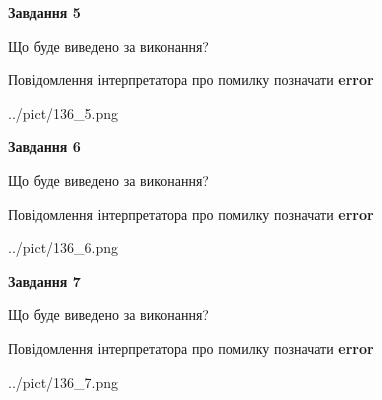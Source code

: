 \documentclass[10pt, ukrainian]{article}
\begin{document}
{\begin {large}
{\begin {center}\textbf{Завдання 5}\end {center}}\par
Що буде виведено за виконання? \par
Повідомлення інтерпретатора про помилку позначати \textbf{error}

\begin{center}
	{../pict/136_5.png}
\end{center}
\newpage

{\begin {center}\textbf{Завдання 6}\end {center}}\par
Що буде виведено за виконання? \par
Повідомлення інтерпретатора про помилку позначати \textbf{error}

\begin{center}
	{../pict/136_6.png}
\end{center}
\newpage

{\begin {center}\textbf{Завдання 7}\end {center}}\par
Що буде виведено за виконання? \par
Повідомлення інтерпретатора про помилку позначати \textbf{error}

\begin{center}
	{../pict/136_7.png}
\end{center}
\newpage

\end {large}}
\end{document}

